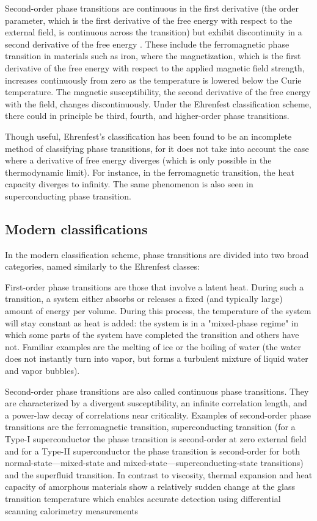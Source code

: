 	Second-order phase transitions are continuous in the first derivative (the order parameter, which is the first derivative of the free energy with respect to the external field, is continuous across the transition) but exhibit discontinuity in a second derivative of the free energy \cite{Blundell2006}. These include the ferromagnetic phase transition in materials such as iron, where the magnetization, which is the first derivative of the free energy with respect to the applied magnetic field strength, increases continuously from zero as the temperature is lowered below the Curie temperature. The magnetic susceptibility, the second derivative of the free energy with the field, changes discontinuously. Under the Ehrenfest classification scheme, there could in principle be third, fourth, and higher-order phase transitions.
	
	Though useful, Ehrenfest's classification has been found to be an incomplete method of classifying phase transitions, for it does not take into account the case where a derivative of free energy diverges (which is only possible in the thermodynamic limit). For instance, in the ferromagnetic transition, the heat capacity diverges to infinity. The same phenomenon is also seen in superconducting phase transition.
	
	\subsection{Modern classifications}
	In the modern classification scheme, phase transitions are divided into two broad categories, named similarly to the Ehrenfest classes:\cite{Jaeger1998}
	
	First-order phase transitions are those that involve a latent heat. During such a transition, a system either absorbs or releases a fixed (and typically large) amount of energy per volume. During this process, the temperature of the system will stay constant as heat is added: the system is in a "mixed-phase regime" in which some parts of the system have completed the transition and others have not. Familiar examples are the melting of ice or the boiling of water (the water does not instantly turn into vapor, but forms a turbulent mixture of liquid water and vapor bubbles). 
	
	Second-order phase transitions are also called continuous phase transitions. They are characterized by a divergent susceptibility, an infinite correlation length, and a power-law decay of correlations near criticality. Examples of second-order phase transitions are the ferromagnetic transition, superconducting transition (for a Type-I superconductor the phase transition is second-order at zero external field and for a Type-II superconductor the phase transition is second-order for both normal-state—mixed-state and mixed-state—superconducting-state transitions) and the superfluid transition. In contrast to viscosity, thermal expansion and heat capacity of amorphous materials show a relatively sudden change at the glass transition temperature \cite{Ojovan2013} which enables accurate detection using differential scanning calorimetry measurements
	
